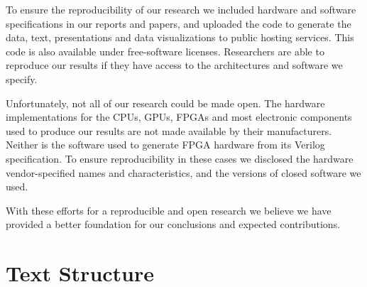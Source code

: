 To ensure the reproducibility of our research we included hardware and software
specifications in our reports and papers, and uploaded the code to generate the
data, text, presentations and data visualizations to public hosting services.
This code is also available under free-software licenses. Researchers are able
to reproduce our results if they have access to the architectures and software
we specify.

Unfortunately, not all of our research could be made open. The hardware
implementations for the CPUs, GPUs, FPGAs and most electronic components used
to produce our results are not made available by their manufacturers. Neither
is the software used to generate FPGA hardware from its Verilog specification.
To ensure reproducibility in these cases we disclosed the hardware vendor-specified
names and characteristics, and the versions of closed software we used.

With these efforts for a reproducible and open research we believe we have
provided a better foundation for our conclusions and expected contributions.

\section{Text Structure}
\label{sec:org}
